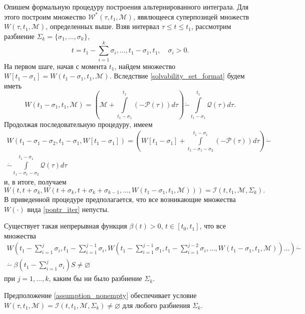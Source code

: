 Опишем формальную процедуру построения альтернированного интеграла. Для этого
 построим множество \( \mathcal{W}^* (\tau, t_1, \mathcal{M}) \), явялющееся
 суперпозицей множеств \( W(\tau, t_1, \mathcal{M}) \), определенных выше. Взяв
 интервал \( \tau \le t \le t_1 \), рассмотрим разбиение \( \Sigma_k = \{ \sigma_1,
 \dots, \sigma_k \} \),
\[
    t = t_1 - \sum_{i=1}^k \sigma_i, \dots, t_1 - \sigma_1, t_1, \quad \sigma_i > 0.
\]
На первом шаге, начав с момента \( t_1 \), найдем множество \( W[t_1 - \sigma_1] = 
 W(t_1 - \sigma_1, t_1, \mathcal{M}) \). Вследствие \eqref{solvability_set_format}
 будем иметь
\begin{equation}\label{first_iter}
     W(t_1 - \sigma_1, t_1, \mathcal{M}) = \left( \mathcal{M} + \int\limits_{t_1 - \sigma_1}
     ^{t_1}(-\mathcal{P}(\tau)) d\tau \right) \dot{-} \int\limits_{t_1 - \sigma_1}^{t_1}
     \mathcal{Q}(\tau)d\tau.
\end{equation}
Продолжая последовательную процедуру, имеем
\begin{equation}
    \begin{gathered}\label{second_iter}
        W(t_1 - \sigma_1 -\sigma_2, t_1 - \sigma_1, W[t_1 - \sigma_1]) = \left( W[t_1 - \sigma_1]
        + \int\limits_{t_1 - \sigma_1 - \sigma_2}^{t_1 - \sigma_1} (-\mathcal{P}(\tau))d\tau \right)
        \dot{-} \\
        \dot{-} \int\limits_{t_1 - \sigma_1 - \sigma_2}^{t_1 - \sigma_1} \mathcal{Q}(\tau) d\tau
    \end{gathered}
\end{equation}
и, в итоге, получаем
\begin{equation}\label{pontr_iter}
    W(t, t + \sigma_k, W(t + \sigma_k, t + \sigma_k + \sigma_{k-1}, \dots, W(t_1 - \sigma_1, t_1,
    \mathcal{M}))) = \mathcal{I}(t, t_1, \mathcal{M}, \Sigma_k).
\end{equation}
В приведенной процедуре предполагается, что все возникающие множества \( W(\cdot) \) вида 
 \eqref{pontr_iter} непусты.
\begin{assumption}\label{assumption_nonempty}
    Существует такая непрерывная функция \( \beta(t) > 0, \, t \in [t_0, t_1] \), что все
     множества
    \begin{equation}
        \begin{gathered}
            W \left( t_1 - \sum_{i=1}^j\sigma_i, t_1 - \sum_{i = 1}^{j - 1}\sigma_i, W 
             \left( t_1 - \sum_{i = 1}^ {j - 1} \sigma_1, t_1 - \sum_{i = 1}^{j - 2} 
             \sigma_i, \dots, W(t_1 - \sigma_1, t_1, \mathcal{M}) \right) \dots \right)
             \dot{-} \\
            \dot{-} \ \beta \left( t_1 - \sum_{i = 1}^j \sigma_i
             \right) S \ne \varnothing 
        \end{gathered}
    \end{equation}
    при \( j = 1, \dots, k \), каким бы ни было разбиение \( \Sigma_k \).
\end{assumption}
Предположение \eqref{assumption_nonempty} обеспечивает условие \( W(\tau, t_1, \mathcal{M}) = 
 \mathcal{I}(t, t_1, \mathcal{M}, \Sigma_k) \ne \varnothing \) для любого разбиения \( \Sigma_k \).

